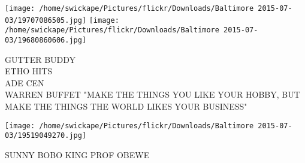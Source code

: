 \documentclass[10pt,letterpaper]{article}
\begin{document}
\texttt{[image: /home/swickape/Pictures/flickr/Downloads/Baltimore 2015-07-03/19707086505.jpg]}
\texttt{[image: /home/swickape/Pictures/flickr/Downloads/Baltimore 2015-07-03/19680860606.jpg]}

GUTTER BUDDY\\
ETHO HITS\\
ADE CEN\\
WARREN BUFFET "MAKE THE THINGS YOU LIKE YOUR HOBBY, BUT MAKE THE THINGS THE WORLD LIKES YOUR BUSINESS"\\
\pagebreak

\texttt{[image: /home/swickape/Pictures/flickr/Downloads/Baltimore 2015-07-03/19519049270.jpg]}

SUNNY BOBO KING PROF OBEWE\\
\pagebreak
\end{document}
